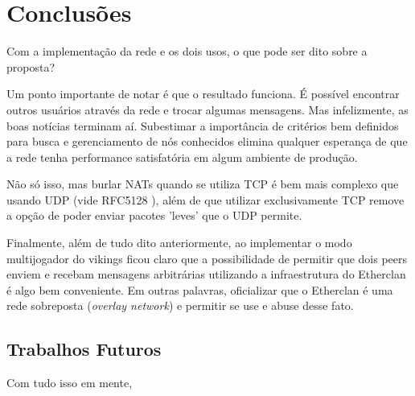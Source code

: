 \chapter{Conclusões}
\label{sec:conclusoes}

Com a implementação da rede e os dois usos, o que pode ser dito sobre a proposta?

Um ponto importante de notar é que o resultado funciona. É possível encontrar outros usuários
através da rede e trocar algumas mensagens. Mas infelizmente, as boas notícias terminam aí.
Subestimar a importância de critérios bem definidos para busca e gerenciamento de nós conhecidos
elimina qualquer esperança de que a rede tenha performance satisfatória em algum ambiente de
produção. 

Não só isso, mas burlar NATs quando se utiliza TCP é bem mais complexo que usando UDP
(vide RFC5128 \cite{rfc5128}), além de que utilizar exclusivamente TCP remove a opção de poder
enviar pacotes 'leves' que o UDP permite.

Finalmente, além de tudo dito anteriormente, ao implementar o modo multijogador do vikings ficou
claro que a possibilidade de permitir que dois peers enviem e recebam mensagens arbitrárias
utilizando a infraestrutura do Etherclan é algo bem conveniente. Em outras palavras, oficializar
que o Etherclan é uma rede sobreposta (\textit{overlay network}) e permitir se use e abuse desse
fato.

\section{Trabalhos Futuros}

Com tudo isso em mente, 